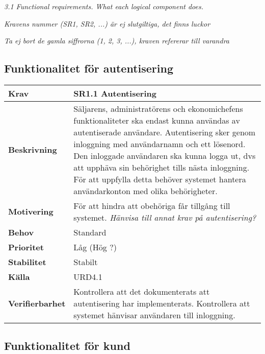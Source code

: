 \documentclass[a4paper, twoside, 11pt, titlepage]{article}
\begin{document}
\emph{3.1 Functional requirements. What each logical component does.}

\emph{Kravens nummer (SR1, SR2, ...) är ej slutgiltiga, det finns luckor}

\emph{Ta ej bort de gamla siffrorna (1, 2, 3, ...), kraven refererar till varandra}

	\subsection{Funktionalitet för autentisering}


	\begin{tabular} { p{2.6cm} p{12.5cm} }
		\hline
		\sffamily\textbf{Krav} & \sffamily\textbf{SR1.1 Autentisering } \\
		\hline
		\sffamily\textbf{Beskrivning} & Säljarens, administratörens och ekonomichefens funktionaliteter ska endast kunna användas av autentiserade användare. Autentisering sker genom inloggning med användarnamn och ett lösenord. Den inloggade användaren ska kunna logga ut, dvs att upphäva sin behörighet tills nästa inloggning. För att uppfylla detta behöver systemet hantera användarkonton med olika behörigheter.  \\
		\hline
		\sffamily\textbf{Motivering} & För att hindra att obehöriga får tillgång till systemet. \emph{Hänvisa till annat krav på autentisering?}  \\
		\hline
		\sffamily\textbf{Behov} & Standard  \\
		\hline
		\sffamily\textbf{Prioritet} & Låg (Hög ?)  \\
		\hline
		\sffamily\textbf{Stabilitet} & Stabilt  \\
		\hline
		\sffamily\textbf{Källa} & URD4.1  \\
		\hline
		\sffamily\textbf{Verifierbarhet} & Kontrollera att det dokumenterats att autentisering har implementerats. Kontrollera att systemet hänvisar användaren till inloggning.  \\
		\hline
	\end{tabular}


	\subsection{Funktionalitet för kund}
\end{document}
